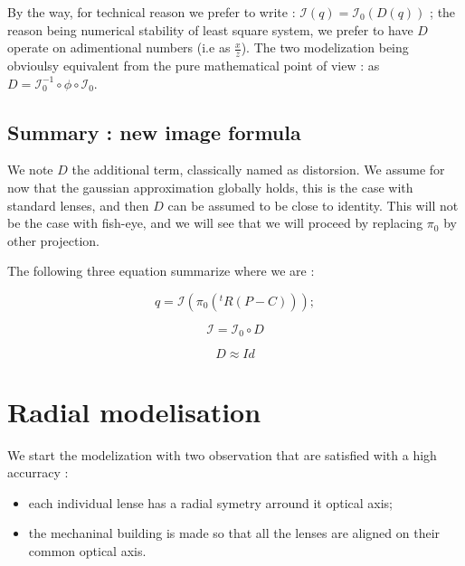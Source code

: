 By the way, for technical reason we prefer to write : $ \mathcal{I}(q) = \mathcal{I}_0(D(q)) $ ; 
the reason being numerical stability of least square system, we prefer to have $D$ operate on adimentional numbers
(i.e as $\frac{x}{z}$).  The two modelization being obvioulsy equivalent from the pure mathematical point of view :
as $D= \mathcal{I}_0^{-1} \circ \phi \circ  \mathcal{I}_0$.


\subsection{Summary : new image formula}

We note $D$ the additional term, classically named as distorsion. We assume for now that the gaussian approximation
globally holds,  this is the case with standard lenses, and then $D$ can be assumed to be close to identity.
This will not be the case with fish-eye, and we will see that we will proceed by replacing $\pi_0$ by other
projection.

The following three equation summarize where we are :



\begin{equation}
	q  =   \mathcal{I} (\pi_0 (^t R (P - C))) ; \label{FormImage1}
\end{equation}

\begin{equation}
	 \mathcal{I} = \mathcal{I}_0  \circ D
\end{equation}

\begin{equation}
	  D \approx Id
\end{equation}


\section{Radial modelisation}

We start the modelization with two observation that are satisfied with a
high accurracy :

\begin{itemize}
    \item  each individual lense has a radial symetry arround it optical axis;
    \item  the mechaninal building is made so that all the lenses are aligned on
	    their common optical axis.
\end{itemize}


